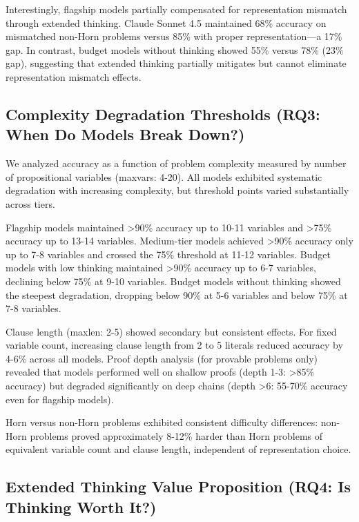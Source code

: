 \documentclass[pdflatex,sn-mathphys-num]{sn-jnl}%
\theoremstyle{thmstyleone}%
\theoremstyle{thmstyletwo}%
\theoremstyle{thmstylethree}%
\begin{document}
Interestingly, flagship models partially compensated for representation mismatch through extended thinking. Claude Sonnet 4.5 maintained 68\% accuracy on mismatched non-Horn problems versus 85\% with proper representation—a 17\% gap. In contrast, budget models without thinking showed 55\% versus 78\% (23\% gap), suggesting that extended thinking partially mitigates but cannot eliminate representation mismatch effects.

\subsection{Complexity Degradation Thresholds (RQ3: When Do Models Break Down?)}\label{subsec:degradation}

We analyzed accuracy as a function of problem complexity measured by number of propositional variables (maxvars: 4-20). All models exhibited systematic degradation with increasing complexity, but threshold points varied substantially across tiers.

Flagship models maintained >90\% accuracy up to 10-11 variables and >75\% accuracy up to 13-14 variables. Medium-tier models achieved >90\% accuracy only up to 7-8 variables and crossed the 75\% threshold at 11-12 variables. Budget models with low thinking maintained >90\% accuracy up to 6-7 variables, declining below 75\% at 9-10 variables. Budget models without thinking showed the steepest degradation, dropping below 90\% at 5-6 variables and below 75\% at 7-8 variables.

Clause length (maxlen: 2-5) showed secondary but consistent effects. For fixed variable count, increasing clause length from 2 to 5 literals reduced accuracy by 4-6\% across all models. Proof depth analysis (for provable problems only) revealed that models performed well on shallow proofs (depth 1-3: >85\% accuracy) but degraded significantly on deep chains (depth >6: 55-70\% accuracy even for flagship models).

Horn versus non-Horn problems exhibited consistent difficulty differences: non-Horn problems proved approximately 8-12\% harder than Horn problems of equivalent variable count and clause length, independent of representation choice.

\subsection{Extended Thinking Value Proposition (RQ4: Is Thinking Worth It?)}\label{subsec:thinking}
\end{document}
